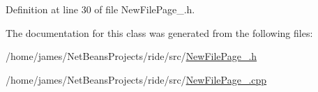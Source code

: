 Definition at line 30 of file New\-File\-Page\-\_.\-h.



The documentation for this class was generated from the following files\-:\begin{DoxyCompactItemize}
\item 
/home/james/\-Net\-Beans\-Projects/ride/src/\hyperlink{_new_file_page__2_8h}{New\-File\-Page\-\_.\-h}\item 
/home/james/\-Net\-Beans\-Projects/ride/src/\hyperlink{_new_file_page__2_8cpp}{New\-File\-Page\-\_.\-cpp}\end{DoxyCompactItemize}
